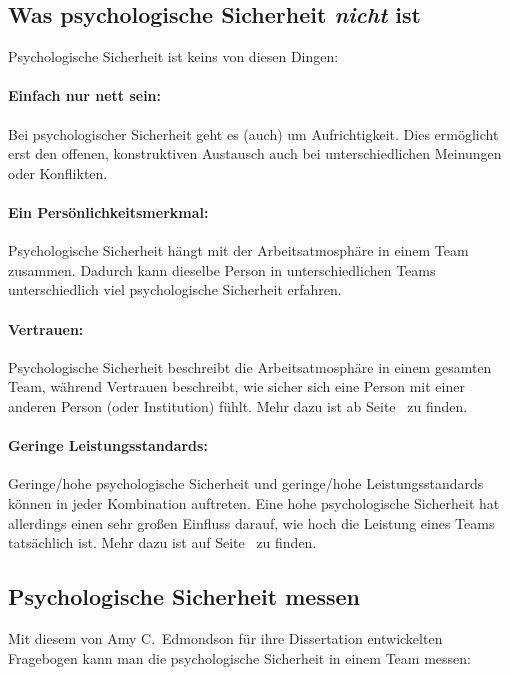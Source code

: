 \subsection{Was psychologische Sicherheit \emph{nicht} ist}

Psychologische Sicherheit ist keins von diesen Dingen:

\paragraph{Einfach nur nett sein:} Bei psychologischer Sicherheit geht es (auch) um Aufrichtigkeit. Dies ermöglicht erst den offenen, konstruktiven Austausch auch bei unterschiedlichen Meinungen oder Konflikten.

\paragraph{Ein Persönlichkeitsmerkmal:} Psychologische Sicherheit hängt mit der Arbeitsatmosphäre in einem Team zusammen. Dadurch kann dieselbe Person in unterschiedlichen Teams unterschiedlich viel psychologische Sicherheit erfahren.

\paragraph{Vertrauen:} Psychologische Sicherheit beschreibt die Arbeitsatmosphäre in einem gesamten Team, während Vertrauen beschreibt, wie sicher sich eine Person mit einer anderen Person (oder Institution) fühlt. Mehr dazu ist ab Seite~\pageref{vertrauen-vs-ps} zu finden.

\paragraph{Geringe Leistungsstandards:} Geringe/hohe psychologische Sicherheit und geringe/hohe Leistungsstandards können in jeder Kombination auftreten. Eine hohe psychologische Sicherheit hat allerdings einen sehr großen Einfluss darauf, wie hoch die Leistung eines Teams tatsächlich ist. Mehr dazu ist auf Seite~\pageref{ps-leistung} zu finden.


\subsection{Psychologische Sicherheit messen}
\label{ps-messen}

Mit diesem von Amy C.~Edmondson für ihre Dissertation entwickelten Fragebogen kann man die psychologische Sicherheit in einem Team messen:

